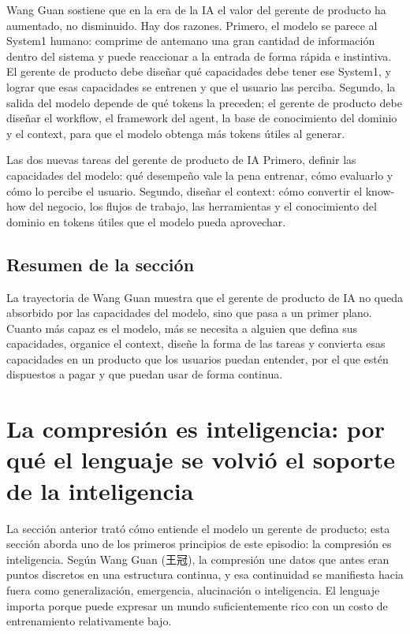\documentclass[a4paper]{article}
\begin{document}
Wang Guan sostiene que en la era de la IA el valor del gerente de producto ha aumentado, no disminuido. Hay dos razones. Primero, el modelo se parece al System1 humano: comprime de antemano una gran cantidad de información dentro del sistema y puede reaccionar a la entrada de forma rápida e instintiva. El gerente de producto debe diseñar qué capacidades debe tener ese System1, y lograr que esas capacidades se entrenen y que el usuario las perciba. Segundo, la salida del modelo depende de qué tokens la preceden; el gerente de producto debe diseñar el workflow, el framework del agent, la base de conocimiento del dominio y el context, para que el modelo obtenga más tokens útiles al generar.

\begin{importantbox}{Las dos nuevas tareas del gerente de producto de IA}
Primero, definir las capacidades del modelo: qué desempeño vale la pena entrenar, cómo evaluarlo y cómo lo percibe el usuario. Segundo, diseñar el context: cómo convertir el know-how del negocio, los flujos de trabajo, las herramientas y el conocimiento del dominio en tokens útiles que el modelo pueda aprovechar.
\end{importantbox}

\subsection{Resumen de la sección}

La trayectoria de Wang Guan muestra que el gerente de producto de IA no queda absorbido por las capacidades del modelo, sino que pasa a un primer plano. Cuanto más capaz es el modelo, más se necesita a alguien que defina sus capacidades, organice el context, diseñe la forma de las tareas y convierta esas capacidades en un producto que los usuarios puedan entender, por el que estén dispuestos a pagar y que puedan usar de forma continua.
\section{La compresión es inteligencia: por qué el lenguaje se volvió el soporte de la inteligencia}

La sección anterior trató cómo entiende el modelo un gerente de producto; esta sección aborda uno de los primeros principios de este episodio: la compresión es inteligencia. Según Wang Guan (王冠), la compresión une datos que antes eran puntos discretos en una estructura continua, y esa continuidad se manifiesta hacia fuera como generalización, emergencia, alucinación o inteligencia. El lenguaje importa porque puede expresar un mundo suficientemente rico con un costo de entrenamiento relativamente bajo.
\end{document}
